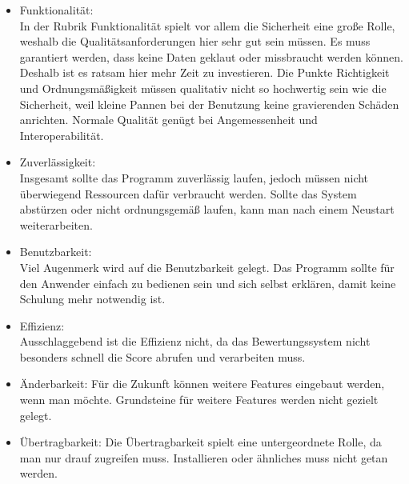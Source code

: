 	\begin{itemize}
		\item Funktionalität:\\
		In der Rubrik Funktionalität spielt vor allem die Sicherheit eine große Rolle, weshalb die Qualitätsanforderungen hier sehr gut sein müssen. Es muss garantiert werden, dass keine Daten geklaut oder missbraucht werden können. Deshalb ist es ratsam hier mehr Zeit zu investieren. Die Punkte Richtigkeit und Ordnungsmäßigkeit müssen qualitativ nicht so hochwertig sein wie die Sicherheit, weil kleine Pannen bei der Benutzung keine gravierenden Schäden anrichten. Normale Qualität genügt bei Angemessenheit und Interoperabilität.\\
		
		\item Zuverlässigkeit:\\
		Insgesamt sollte das Programm zuverlässig laufen, jedoch müssen nicht überwiegend Ressourcen dafür verbraucht werden. Sollte das System abstürzen oder nicht ordnungsgemäß laufen, kann man nach einem Neustart weiterarbeiten.\\
		
		\item Benutzbarkeit:\\
		Viel Augenmerk wird auf die Benutzbarkeit gelegt. Das Programm sollte für den Anwender einfach zu bedienen sein und sich selbst erklären, damit keine Schulung mehr notwendig ist. \\
		
		\item 	Effizienz:\\
		Ausschlaggebend ist die Effizienz nicht, da das Bewertungssystem nicht besonders schnell die Score abrufen und verarbeiten muss. \\
		
		\item Änderbarkeit:		
		Für die Zukunft können weitere Features eingebaut werden, wenn man möchte. Grundsteine für weitere Features werden nicht gezielt gelegt.\\
					
		\item  Übertragbarkeit:
		Die Übertragbarkeit spielt eine untergeordnete Rolle, da man nur drauf zugreifen muss. Installieren oder ähnliches muss nicht getan werden. \\
			
	\end{itemize}